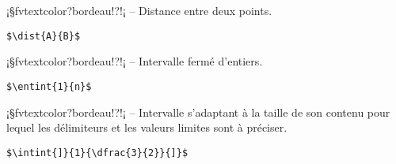 \documentclass[11pt,a4paper,rgb]{report}
\begin{document}
\setlength{\leftskip}{0pt}
\setlength{\textwidth}{18cm}%


\vspace*{.75cm}

\inCodeStub¡§fvtextcolor?bordeau!?!¡ -- Distance entre deux points.

\setlength{\leftskip}{.75cm}%
\setlength{\textwidth}{17.25cm}%

\colorbox{blue!15}{}
\hfill
\begin{minipage}{.65\textwidth}
	\begin{lstlisting}[linewidth=\textwidth, language={[LaTeX]TeX}]
	$\dist{A}{B}$
	\end{lstlisting}
\end{minipage}

\setlength{\leftskip}{0pt}
\setlength{\textwidth}{18cm}%


\vspace*{.75cm}

\inCodeStub¡§fvtextcolor?bordeau!?!¡ -- Intervalle fermé d'entiers.

\setlength{\leftskip}{.75cm}%
\setlength{\textwidth}{17.25cm}%

\colorbox{blue!15}{}
\hfill
\begin{minipage}{.65\textwidth}
	\begin{lstlisting}[linewidth=\textwidth, language={[LaTeX]TeX}]
	$\entint{1}{n}$
	\end{lstlisting}
\end{minipage}

\setlength{\leftskip}{0pt}
\setlength{\textwidth}{18cm}%


\vspace*{.75cm}

\inCodeStub¡§fvtextcolor?bordeau!?!¡ -- Intervalle s'adaptant à la taille de son contenu pour lequel les délimiteurs et les valeurs limites sont à préciser.

\setlength{\leftskip}{.75cm}%
\setlength{\textwidth}{17.25cm}%

\colorbox{blue!15}{\pbox{.35\textwidth}{$\intint{]}{1}{\dfrac{3}{2}}{]}$}}
\hfill
\begin{minipage}{.65\textwidth}
	\begin{lstlisting}[linewidth=\textwidth, language={[LaTeX]TeX}]
	$\intint{]}{1}{\dfrac{3}{2}}{]}$
	\end{lstlisting}
\end{minipage}
\end{document}
